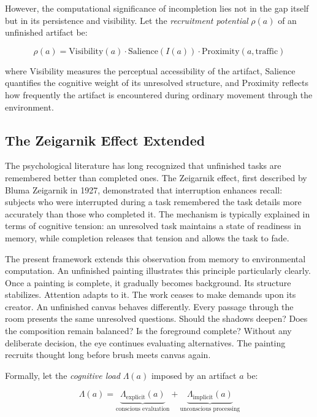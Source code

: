 \documentclass[12pt,oneside]{article}
\theoremstyle{remark}
\begin{document}
However, the computational significance of incompletion lies not in the gap itself but in its persistence and visibility. Let the \emph{recruitment potential} $\rho(a)$ of an unfinished artifact be:

\begin{equation}
\rho(a) = \text{Visibility}(a) \cdot \text{Salience}(I(a)) \cdot \text{Proximity}(a, \text{traffic})
\end{equation}

where Visibility measures the perceptual accessibility of the artifact, Salience quantifies the cognitive weight of its unresolved structure, and Proximity reflects how frequently the artifact is encountered during ordinary movement through the environment.

\subsection{The Zeigarnik Effect Extended}

The psychological literature has long recognized that unfinished tasks are remembered better than completed ones. The Zeigarnik effect, first described by Bluma Zeigarnik in 1927, demonstrated that interruption enhances recall: subjects who were interrupted during a task remembered the task details more accurately than those who completed it. The mechanism is typically explained in terms of cognitive tension: an unresolved task maintains a state of readiness in memory, while completion releases that tension and allows the task to fade.

The present framework extends this observation from memory to environmental computation. An unfinished painting illustrates this principle particularly clearly. Once a painting is complete, it gradually becomes background. Its structure stabilizes. Attention adapts to it. The work ceases to make demands upon its creator. An unfinished canvas behaves differently. Every passage through the room presents the same unresolved questions. Should the shadows deepen? Does the composition remain balanced? Is the foreground complete? Without any deliberate decision, the eye continues evaluating alternatives. The painting recruits thought long before brush meets canvas again.

Formally, let the \emph{cognitive load} $\Lambda(a)$ imposed by an artifact $a$ be:

\begin{equation}
\Lambda(a) = \underbrace{\Lambda_{\text{explicit}}(a)}_{\text{conscious evaluation}} + \underbrace{\Lambda_{\text{implicit}}(a)}_{\text{unconscious processing}}
\end{equation}
\end{document}
